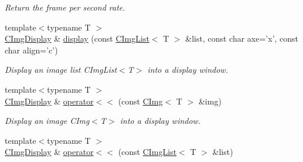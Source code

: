 \begin{DoxyCompactItemize}
\begin{DoxyCompactList}\small\item\em Return the frame per second rate. \item\end{DoxyCompactList}\item 
{\footnotesize template$<$typename T $>$ }\\\hyperlink{structcimg__library_1_1_c_img_display}{CImgDisplay} \& \hyperlink{structcimg__library_1_1_c_img_display_ad8acdcf15b78304af9e1a83e2a76ca57}{display} (const \hyperlink{structcimg__library_1_1_c_img_list}{CImgList}$<$ T $>$ \&list, const char axe='x', const char align='c')
\begin{DoxyCompactList}\small\item\em Display an image list CImgList$<$T$>$ into a display window. \item\end{DoxyCompactList}\item 
\hypertarget{structcimg__library_1_1_c_img_display_ab3a91a1c7c31e9fb0db1bfbb1a71d6c3}{
{\footnotesize template$<$typename T $>$ }\\\hyperlink{structcimg__library_1_1_c_img_display}{CImgDisplay} \& \hyperlink{structcimg__library_1_1_c_img_display_ab3a91a1c7c31e9fb0db1bfbb1a71d6c3}{operator$<$$<$} (const \hyperlink{structcimg__library_1_1_c_img}{CImg}$<$ T $>$ \&img)}
\label{structcimg__library_1_1_c_img_display_ab3a91a1c7c31e9fb0db1bfbb1a71d6c3}

\begin{DoxyCompactList}\small\item\em Display an image CImg$<$T$>$ into a display window. \item\end{DoxyCompactList}\item 
\hypertarget{structcimg__library_1_1_c_img_display_ada37d4d3220ed2e4eb322afc0bd30f5e}{
{\footnotesize template$<$typename T $>$ }\\\hyperlink{structcimg__library_1_1_c_img_display}{CImgDisplay} \& \hyperlink{structcimg__library_1_1_c_img_display_ada37d4d3220ed2e4eb322afc0bd30f5e}{operator$<$$<$} (const \hyperlink{structcimg__library_1_1_c_img_list}{CImgList}$<$ T $>$ \&list)}
\label{structcimg__library_1_1_c_img_display_ada37d4d3220ed2e4eb322afc0bd30f5e}


\end{DoxyCompactItemize}

